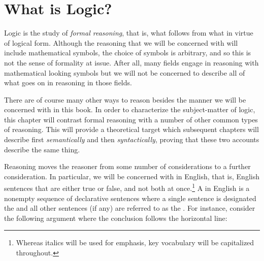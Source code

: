 

\chapter{What is Logic?}
\label{ch.introduction}

Logic is the study of \textit{formal reasoning}, that is, what follows from what in virtue of logical form.
Although the reasoning that we will be concerned with will include mathematical symbols, the choice of symbols is arbitrary, and so this is not the sense of formality at issue.
After all, many fields engage in reasoning with mathematical looking symbols but we will not be concerned to describe all of what goes on in reasoning in those fields.

There are of course many other ways to reason besides the manner we will be concerned with in this book.
In order to characterize the subject-matter of logic, this chapter will contrast formal reasoning with a number of other common types of reasoning.
This will provide a theoretical target which subsequent chapters will describe first \textit{semantically} and then \textit{syntactically}, proving that these two accounts describe the same thing.

Reasoning moves the reasoner from some number of considerations to a further consideration.
In particular, we will be concerned with  in English, that is, English sentences that are either true or false, and not both at once.\footnote{Whereas italics will be used for emphasis, key vocabulary will be capitalized throughout.}
A  in English is a nonempty sequence of declarative sentences where a single sentence is designated the  and all other sentences (if any) are referred to as the .
For instance, consider the following argument where the conclusion follows the horizontal line:

\begin{earg}
\end{earg}

